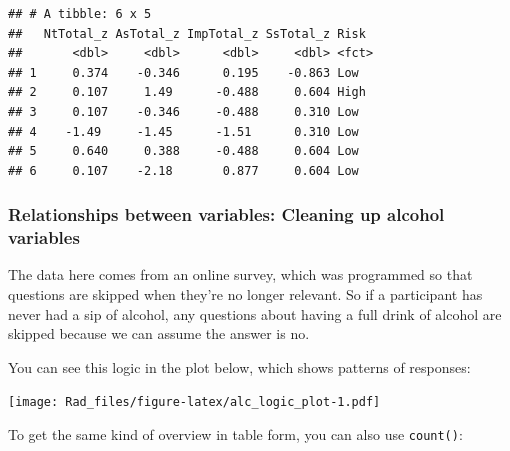 \documentclass[
]{book}
\newenvironment{Shaded}{\begin{snugshade}}{\end{snugshade}}
\newcommand{\AttributeTok}[1]{\textcolor[rgb]{0.77,0.63,0.00}{#1}}
\newcommand{\ConstantTok}[1]{\textcolor[rgb]{0.00,0.00,0.00}{#1}}
\newcommand{\FunctionTok}[1]{\textcolor[rgb]{0.00,0.00,0.00}{#1}}
\newcommand{\NormalTok}[1]{#1}
\newcommand{\OtherTok}[1]{\textcolor[rgb]{0.56,0.35,0.01}{#1}}
\newcommand{\SpecialCharTok}[1]{\textcolor[rgb]{0.00,0.00,0.00}{#1}}
\newcommand{\StringTok}[1]{\textcolor[rgb]{0.31,0.60,0.02}{#1}}
\begin{document}
\begin{Shaded}
\end{Shaded}

\begin{verbatim}
## # A tibble: 6 x 5
##   NtTotal_z AsTotal_z ImpTotal_z SsTotal_z Risk 
##       <dbl>     <dbl>      <dbl>     <dbl> <fct>
## 1     0.374    -0.346      0.195    -0.863 Low  
## 2     0.107     1.49      -0.488     0.604 High 
## 3     0.107    -0.346     -0.488     0.310 Low  
## 4    -1.49     -1.45      -1.51      0.310 Low  
## 5     0.640     0.388     -0.488     0.604 Low  
## 6     0.107    -2.18       0.877     0.604 Low
\end{verbatim}

\hypertarget{relationships-between-variables-cleaning-up-alcohol-variables}{%
\subsubsection*{Relationships between variables: Cleaning up alcohol variables}\label{relationships-between-variables-cleaning-up-alcohol-variables}}

The data here comes from an online survey, which was programmed so that questions
are skipped when they're no longer relevant. So if a participant has never
had a sip of alcohol, any questions about having a full drink of alcohol
are skipped because we can assume the answer is no.

You can see this logic in the plot below, which shows patterns of responses:

\texttt{[image: Rad\_files/figure-latex/alc\_logic\_plot-1.pdf]}

To get the same kind of overview in table form, you can also use \texttt{count()}:
\end{document}
